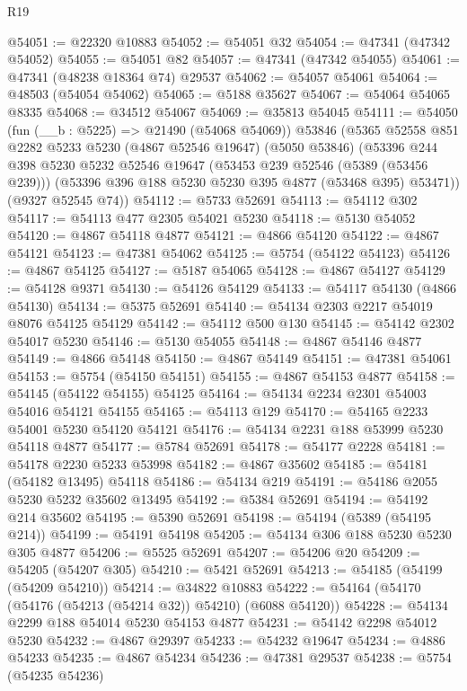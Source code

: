 \begin{lexlean}{R19}
\begin{coremodule}
@54051 := @22320 @10883
@54052 := @54051 @32
@54054 := @47341 (@47342 @54052)
@54055 := @54051 @82
@54057 := @47341 (@47342 @54055)
@54061 := @47341 (@48238 @18364 @74) @29537
@54062 := @54057 @54061
@54064 := @48503 (@54054 @54062)
@54065 := @5188 @35627
@54067 := @54064 @54065 @8335
@54068 := @34512 @54067
@54069 := @35813 @54045
@54111 := @54050
    (fun (__b : @5225) => @21490 (@54068 @54069))
    @53846
    (@5365
      @52558
      @851
      @2282
      @5233
      @5230
      (@4867 @52546 @19647)
      (@5050 @53846)
      (@53396
        @244
        @398
        @5230
        @5232
        @52546
        @19647
        (@53453 @239 @52546 (@5389 (@53456 @239)))
        (@53396 @396 @188 @5230 @5230 @395 @4877 (@53468 @395) @53471))
      (@9327 @52545 @74))
@54112 := @5733 @52691
@54113 := @54112 @302
@54117 := @54113 @477 @2305 @54021 @5230
@54118 := @5130 @54052
@54120 := @4867 @54118 @4877
@54121 := @4866 @54120
@54122 := @4867 @54121
@54123 := @47381 @54062
@54125 := @5754 (@54122 @54123)
@54126 := @4867 @54125
@54127 := @5187 @54065
@54128 := @4867 @54127
@54129 := @54128 @9371
@54130 := @54126 @54129
@54133 := @54117 @54130 (@4866 @54130)
@54134 := @5375 @52691
@54140 := @54134 @2303 @2217 @54019 @8076 @54125 @54129
@54142 := @54112 @500 @130
@54145 := @54142 @2302 @54017 @5230
@54146 := @5130 @54055
@54148 := @4867 @54146 @4877
@54149 := @4866 @54148
@54150 := @4867 @54149
@54151 := @47381 @54061
@54153 := @5754 (@54150 @54151)
@54155 := @4867 @54153 @4877
@54158 := @54145 (@54122 @54155) @54125
@54164 := @54134 @2234 @2301 @54003 @54016 @54121 @54155
@54165 := @54113 @129
@54170 := @54165 @2233 @54001 @5230 @54120 @54121
@54176 := @54134 @2231 @188 @53999 @5230 @54118 @4877
@54177 := @5784 @52691
@54178 := @54177 @2228
@54181 := @54178 @2230 @5233 @53998
@54182 := @4867 @35602
@54185 := @54181 (@54182 @13495) @54118
@54186 := @54134 @219
@54191 := @54186 @2055 @5230 @5232 @35602 @13495
@54192 := @5384 @52691
@54194 := @54192 @214 @35602
@54195 := @5390 @52691
@54198 := @54194 (@5389 (@54195 @214))
@54199 := @54191 @54198
@54205 := @54134 @306 @188 @5230 @5230 @305 @4877
@54206 := @5525 @52691
@54207 := @54206 @20
@54209 := @54205 (@54207 @305)
@54210 := @5421 @52691
@54213 := @54185 (@54199 (@54209 @54210))
@54214 := @34822 @10883
@54222 := @54164 (@54170 (@54176 (@54213 (@54214 @32)) @54210) (@6088 @54120))
@54228 := @54134 @2299 @188 @54014 @5230 @54153 @4877
@54231 := @54142 @2298 @54012 @5230
@54232 := @4867 @29397
@54233 := @54232 @19647
@54234 := @4886 @54233
@54235 := @4867 @54234
@54236 := @47381 @29537
@54238 := @5754 (@54235 @54236)

\end{coremodule}
\end{lexlean}
